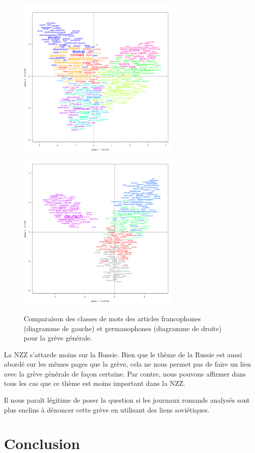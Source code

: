 \documentclass[french,a4paper]{article}
\begin{document}
\begin{figure}[ht!]
    \includegraphics[width=8cm]{imgs/FR/greve_15classes.png}
    \includegraphics[width=8cm]{imgs/DE/Streik_15classes.png}
    \caption{Comparaison des classes de mots des articles francophones (diagramme de gauche) et germanophones (diagramme de droite) pour la grève générale.}
    \centering
    \label{fig:hoffmann2}
\end{figure}

La NZZ s'attarde moins sur la Russie.
Bien que le thème de la Russie est aussi abordé sur les mêmes pages que la grève, cela ne nous permet pas de faire un lien avec la grève générale de façon certaine.
Par contre, nous pouvons affirmer dans tous les cas que ce thème est moins important dans la NZZ.

Il nous paraît légitime de poser la question si les journaux romands analysés sont plus enclins à dénoncer cette grève en utilisant des liens soviétiques. 

\section*{Conclusion}
\end{document}
